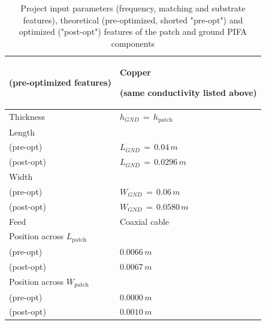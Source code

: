 \documentclass[10 pt,a4paper,twocolumn]{article}
\begin{document}
{\begin{table}[t!]
\begin{center}
{\begin{tabular}{|m{4.2cm}|m{4.2cm}|}
			(pre-optimized features)
			& \cellcolor{flax} Copper
			
			(same conductivity listed above) \\
			\hline
			Thickness & $h_{GND}\,=\,h_{\operatorname{patch}}$
			\\
			\hline
			Length & \\ 
			(pre-opt) & $L_{GND}\,=\,0.04\,m$\\
			(post-opt) & $L_{GND}\,=\,0.0296\,m$\\
			\hline 
		Width &  	\\
		(pre-opt) & $W_{GND}\,=\,0.06\,m$\\
		(post-opt) & $W_{GND}\,=\,0.0580\,m$ \\
			\hline
			\cellcolor{flax}Feed & \cellcolor{flax} Coaxial cable \\
			\hline
			Position across $L_{\operatorname{patch}}$ &\\
			(pre-opt) & $0.0066\,m$ \\
			(post-opt) & $0.0067\,m$ \\
			\hline
			Position across $W_{\operatorname{patch}}$ & \\
			(pre-opt) & $0.0000\,m$\\
			(post-opt) & $0.0010\,m$\\
			\hline
	\end{tabular}}
	\caption{Project input parameters (frequency, matching and substrate features), theoretical (pre-optimized, shorted "pre-opt") and optimized ("post-opt") features of the patch and ground PIFA components}
	\label{table:pifa design parameters}
\end{center}

\end{table}

}
\end{document}
